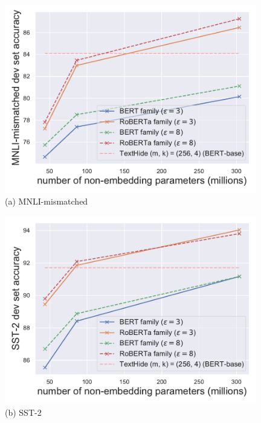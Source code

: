 \begin{figure}[ht]
\begin{center}
\begin{minipage}[t]{0.45\linewidth}
\centering
{\includegraphics[width=0.98\textwidth]{figs/scaling-mnli.pdf}}
(a) MNLI-mismatched
\end{minipage}
\begin{minipage}[t]{0.45\linewidth}
\centering
{\includegraphics[width=0.98\textwidth]{figs/scaling-sst-2.pdf}}
(b) SST-2
\end{minipage}


\end{center}
\end{figure}
